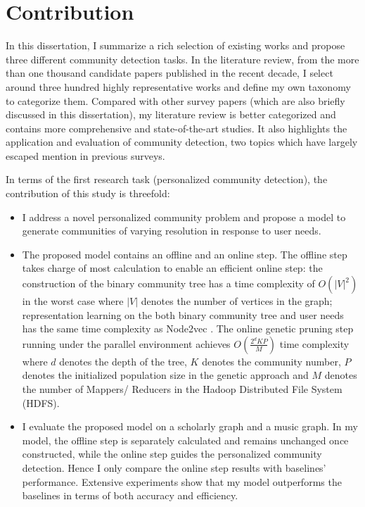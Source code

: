 \section{Contribution}
In this dissertation, I summarize a rich selection of existing works and propose three different community detection tasks. In the literature review, from the more than one thousand candidate papers published in the recent decade, I select around three hundred highly representative works and define my own taxonomy to categorize them. Compared with other survey papers (which are also briefly discussed in this dissertation), my literature review is better categorized and contains more comprehensive and state-of-the-art studies. It also highlights the application and evaluation of community detection, two topics which have largely escaped mention in previous surveys.

In terms of the first research task (personalized community detection), the contribution of this study is threefold:

\begin{itemize}
	\item I address a novel personalized community problem and propose a model to generate communities of varying resolution in response to user needs.
	\item The proposed model contains an offline and an online step. The offline step takes charge of most calculation to enable an efficient online step: the construction of the binary community tree has a time complexity of $O(|V|^{2})$ in the worst case where $|V|$ denotes the number of vertices in the graph; representation learning on the both binary community tree and user needs has the same time complexity as Node2vec \cite{grover2016node2vec}. The online genetic pruning step running under the parallel environment achieves $O(\frac{2^dKP}{M})$ time complexity where $d$ denotes the depth of the tree, $K$ denotes the community number, $P$ denotes the initialized population size in the genetic approach and $M$ denotes the number of Mappers/ Reducers in the Hadoop Distributed File System (HDFS). 
	\item I evaluate the proposed model on a scholarly graph and a music graph. In my model, the offline step is separately calculated and  remains unchanged once constructed, while the online step guides the personalized community detection. Hence I only compare the online step results with baselines' performance. Extensive experiments show that my model outperforms the baselines in terms of both accuracy and efficiency.
\end{itemize}

